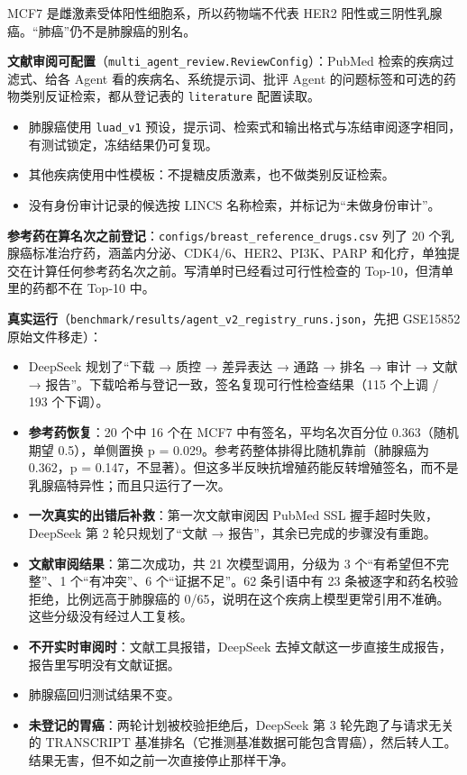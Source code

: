 \documentclass[
  10pt,
]{ctexart}
\providecommand{\tightlist}{%
  \setlength{\itemsep}{0pt}\setlength{\parskip}{0pt}}
\begin{document}
MCF7 是雌激素受体阳性细胞系，所以药物端不代表 HER2
阳性或三阴性乳腺癌。``肺癌''仍不是肺腺癌的别名。

\textbf{文献审阅可配置}（\texttt{multi\_\allowbreak{}agent\_\allowbreak{}review.\allowbreak{}ReviewConfig}）：PubMed
检索的疾病过滤式、给各 Agent 看的疾病名、系统提示词、批评 Agent
的问题标签和可选的药物类别反证检索，都从登记表的 \texttt{literature}
配置读取。

\begin{itemize}
\tightlist
\item
  肺腺癌使用 \texttt{luad\_\allowbreak{}v1}
  预设，提示词、检索式和输出格式与冻结审阅逐字相同，有测试锁定，冻结结果仍可复现。
\item
  其他疾病使用中性模板：不提糖皮质激素，也不做类别反证检索。
\item
  没有身份审计记录的候选按 LINCS 名称检索，并标记为``未做身份审计''。
\end{itemize}

\textbf{参考药在算名次之前登记}：\texttt{configs/\allowbreak{}breast\_\allowbreak{}reference\_\allowbreak{}drugs.\allowbreak{}csv}
列了 20 个乳腺癌标准治疗药，涵盖内分泌、CDK4/6、HER2、PI3K、PARP
和化疗，单独提交在计算任何参考药名次之前。写清单时已经看过可行性检查的
Top-10，但清单里的药都不在 Top-10 中。

\textbf{真实运行}（\texttt{benchmark/\allowbreak{}results/\allowbreak{}agent\_\allowbreak{}v2\_\allowbreak{}registry\_\allowbreak{}runs.\allowbreak{}json}，先把
GSE15852 原始文件移走）：

\begin{itemize}
\tightlist
\item
  DeepSeek 规划了``下载 → 质控 → 差异表达 → 通路 → 排名 → 审计 → 文献 →
  报告''。下载哈希与登记一致，签名复现可行性检查结果（115 个上调 / 193
  个下调）。
\item
  \textbf{参考药恢复}：20 个中 16 个在 MCF7 中有签名，平均名次百分位
  0.363（随机期望 0.5），单侧置换 p =
  0.029。参考药整体排得比随机靠前（肺腺癌为 0.362，p =
  0.147，不显著）。但这多半反映抗增殖药能反转增殖签名，而不是乳腺癌特异性；而且只运行了一次。
\item
  \textbf{一次真实的出错后补救}：第一次文献审阅因 PubMed SSL
  握手超时失败，DeepSeek 第 2 轮只规划了``文献 →
  报告''，其余已完成的步骤没有重跑。
\item
  \textbf{文献审阅结果}：第二次成功，共 21 次模型调用，分级为 3
  个``有希望但不完整''、1 个``有冲突''、6 个``证据不足''。62 条引语中有
  23 条被逐字和药名校验拒绝，比例远高于肺腺癌的
  0/65，说明在这个疾病上模型更常引用不准确。这些分级没有经过人工复核。
\item
  \textbf{不开实时审阅时}：文献工具报错，DeepSeek
  去掉文献这一步直接生成报告，报告里写明没有文献证据。
\item
  肺腺癌回归测试结果不变。
\item
  \textbf{未登记的胃癌}：两轮计划被校验拒绝后，DeepSeek 第 3
  轮先跑了与请求无关的 TRANSCRIPT
  基准排名（它推测基准数据可能包含胃癌），然后转人工。结果无害，但不如之前一次直接停止那样干净。
\end{itemize}
\end{document}
